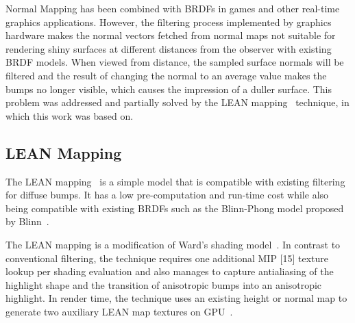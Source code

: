 \documentclass[10pt, conference]{IEEEtran}
\begin{document}
Normal Mapping has been combined with BRDFs in games and other real-time graphics applications. However, the filtering process implemented by graphics hardware makes the normal vectors fetched from normal maps not suitable for rendering shiny surfaces at different distances from the observer with existing BRDF models. When viewed from distance, the sampled surface normals will be filtered and the result of changing the normal to an average value makes the bumps no longer visible, which causes the impression of a duller surface. This problem was addressed and partially solved by the LEAN mapping~\cite{Olano:2010:LM:1730804.1730834} technique, in which this work was based on.


\subsection{LEAN Mapping}
%
The LEAN mapping~\cite{Olano:2010:LM:1730804.1730834} is a simple model that is compatible with existing filtering for diffuse bumps. It has a low pre-computation and run-time cost while also being compatible with existing BRDFs such as the Blinn-Phong model proposed by Blinn~\cite{Blinn:1977:MLR:563858.563893}.

The LEAN mapping is a modification of Ward’s shading model~\cite{Ward:1992:MMA:133994.134078}. In contrast to conventional filtering, the technique requires one additional MIP [15] texture lookup per shading evaluation and also manages to capture antialiasing of the highlight shape and the transition of anisotropic bumps into an anisotropic highlight. In render time, the technique uses an existing height or normal map to generate two auxiliary LEAN map textures on GPU~\cite{Olano:2010:LM:1730804.1730834}.
\end{document}
